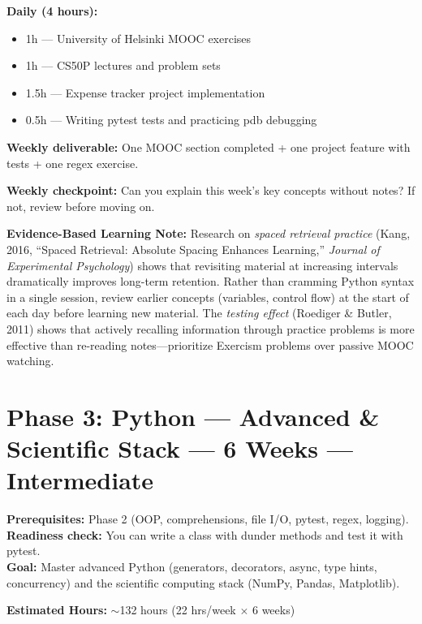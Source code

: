 \documentclass[11pt, a4paper, oneside]{report}
\begin{document}
\begin{practicebox}
\textbf{Daily (4 hours):}
\begin{itemize}[leftmargin=*]
\item 1h --- University of Helsinki MOOC exercises
\item 1h --- CS50P lectures and problem sets
\item 1.5h --- Expense tracker project implementation
\item 0.5h --- Writing pytest tests and practicing pdb debugging
\end{itemize}

\textbf{Weekly deliverable:} One MOOC section completed + one project feature with tests + one regex exercise.


\textbf{Weekly checkpoint:} Can you explain this week's key concepts without notes? If not, review before moving on.

\textbf{Evidence-Based Learning Note:} Research on \emph{spaced retrieval practice} (Kang, 2016, ``Spaced Retrieval: Absolute Spacing Enhances Learning,'' \emph{Journal of Experimental Psychology}) shows that revisiting material at increasing intervals dramatically improves long-term retention. Rather than cramming Python syntax in a single session, review earlier concepts (variables, control flow) at the start of each day before learning new material. The \emph{testing effect} (Roediger \& Butler, 2011) shows that actively recalling information through practice problems is more effective than re-reading notes---prioritize Exercism problems over passive MOOC watching.

\end{practicebox}


\clearpage
\section[Phase 3: Python Advanced]{Phase 3: Python --- Advanced \& Scientific Stack --- 6 Weeks --- Intermediate}

\begin{prereqbox}
\textbf{Prerequisites:} Phase 2 (OOP, comprehensions, file I/O, pytest, regex, logging).\\
\textbf{Readiness check:} You can write a class with dunder methods and test it with pytest.\\
\textbf{Goal:} Master advanced Python (generators, decorators, async, type hints, concurrency) and the scientific computing stack (NumPy, Pandas, Matplotlib).


\textbf{Estimated Hours:} $\sim$132 hours (22 hrs/week $\times$ 6 weeks)
\end{prereqbox}
\end{document}
